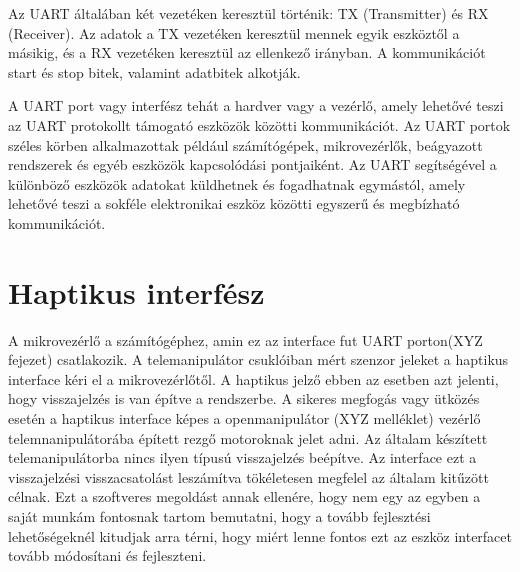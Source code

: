 Az UART általában két vezetéken keresztül történik: TX (Transmitter) és RX (Receiver). Az adatok a TX vezetéken keresztül mennek egyik eszköztől a másikig, és a RX vezetéken keresztül az ellenkező irányban. A kommunikációt start és stop bitek, valamint adatbitek alkotják.

A UART port vagy interfész tehát a hardver vagy a vezérlő, amely lehetővé teszi az UART protokollt támogató eszközök közötti kommunikációt. Az UART portok széles körben alkalmazottak például számítógépek, mikrovezérlők, beágyazott rendszerek és egyéb eszközök kapcsolódási pontjaiként. Az UART segítségével a különböző eszközök adatokat küldhetnek és fogadhatnak egymástól, amely lehetővé teszi a sokféle elektronikai eszköz közötti egyszerű és megbízható kommunikációt.

\section{Haptikus interfész}

A mikrovezérlő a számítógéphez, amin ez az interface fut UART porton(XYZ fejezet) csatlakozik. A telemanipulátor csuklóiban mért szenzor jeleket a haptikus interface kéri el a mikrovezérlőtől. A haptikus jelző ebben az esetben azt jelenti, hogy visszajelzés is van építve a rendszerbe. A sikeres megfogás vagy ütközés esetén a haptikus interface képes a openmanipulátor (XYZ melléklet) vezérlő telemnanipulátorába épített rezgő motoroknak jelet adni. Az általam készített telemanipulátorba nincs ilyen típusú visszajelzés beépítve. Az interface ezt a visszajelzési visszacsatolást leszámítva tökéletesen megfelel az általam kitűzött célnak. Ezt a szoftveres megoldást annak ellenére, hogy nem egy az egyben a saját munkám fontosnak tartom bemutatni, hogy a tovább fejlesztési lehetőségeknél kitudjak arra térni, hogy miért lenne fontos ezt az eszköz interfacet tovább módosítani és fejleszteni.

